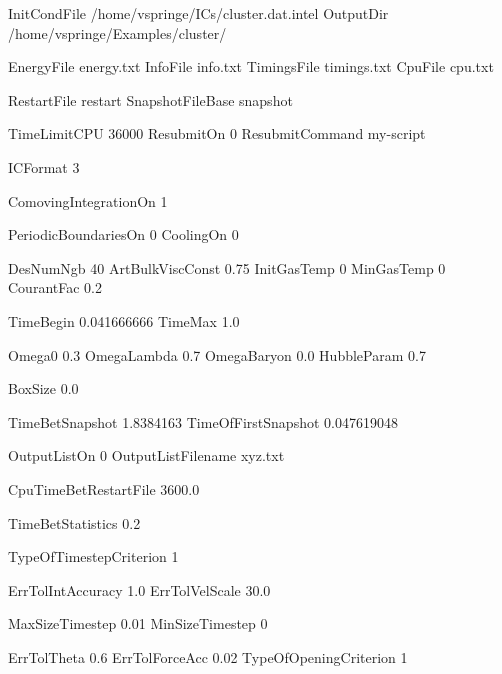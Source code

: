 
InitCondFile      /home/vspringe/ICs/cluster.dat.intel
OutputDir         /home/vspringe/Examples/cluster/


EnergyFile        energy.txt
InfoFile          info.txt
TimingsFile       timings.txt
CpuFile           cpu.txt

RestartFile       restart
SnapshotFileBase  snapshot



TimeLimitCPU      36000  %
ResubmitOn        0
ResubmitCommand   my-script



ICFormat                  3     %

ComovingIntegrationOn     1 

PeriodicBoundariesOn      0
CoolingOn                 0



DesNumNgb           40
ArtBulkViscConst    0.75
InitGasTemp         0
MinGasTemp          0
CourantFac          0.2


TimeBegin	    0.041666666     %
TimeMax	            1.0             %

Omega0                0.3
OmegaLambda           0.7
OmegaBaryon           0.0
HubbleParam           0.7

BoxSize               0.0

TimeBetSnapshot        1.8384163    %
TimeOfFirstSnapshot    0.047619048  %

OutputListOn        0
OutputListFilename  xyz.txt



CpuTimeBetRestartFile   3600.0

TimeBetStatistics       0.2



TypeOfTimestepCriterion 1

ErrTolIntAccuracy           1.0
ErrTolVelScale              30.0

MaxSizeTimestep             0.01  
MinSizeTimestep             0 



ErrTolTheta            0.6     
ErrTolForceAcc         0.02
TypeOfOpeningCriterion 1


